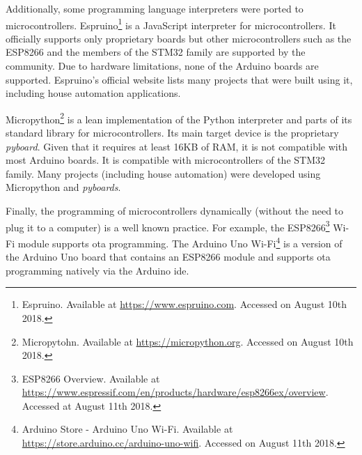 Additionally, some programming language interpreters were ported to microcontrollers. Espruino\footnote{Espruino. Available at \url{https://www.espruino.com}. Accessed on August 10th 2018.} is a JavaScript interpreter for microcontrollers. It officially supports only proprietary boards but other microcontrollers such as the ESP8266 and the members of the STM32 family are supported by the community. Due to hardware limitations, none of the Arduino boards are supported. Espruino's official website lists many projects that were built using it, including house automation applications. 

Micropython\footnote{Micropytohn. Available at \url{https://micropython.org}. Accessed on August 10th 2018.} is a lean implementation of the Python interpreter and parts of its standard library for microcontrollers. Its main target device is the proprietary \textit{pyboard}. Given that it requires at least 16KB of RAM, it is not compatible with most Arduino boards. It is compatible with microcontrollers of the STM32 family. Many projects (including house automation) were developed using Micropython and \textit{pyboards}. 

Finally, the programming of microcontrollers dynamically (without the need to plug it to a computer) is a well known practice. For example, the ESP8266\footnote{ESP8266 Overview. Available at \url{https://www.espressif.com/en/products/hardware/esp8266ex/overview}. Accessed at August 11th 2018.} Wi-Fi module supports \ac{ota} programming. The Arduino Uno Wi-Fi\footnote{Arduino Store - Arduino Uno Wi-Fi. Available at \url{https://store.arduino.cc/arduino-uno-wifi}. Accessed on August 11th 2018.} is a version of the Arduino Uno board that contains an ESP8266 module and supports \ac{ota} programming natively via the Arduino \acs{ide}.